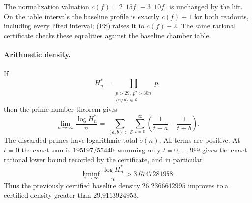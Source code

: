 The normalization valuation
$c(f)=2\lfloor15f\rfloor-3\lfloor10f\rfloor$ is unchanged by the lift.
On the table intervals the baseline profile is exactly $c(f)+1$ for both
readouts, including every lifted interval; (PS) raises it to $c(f)+2$.
The same rational certificate checks these equalities against the
baseline chamber table.

\paragraph{Arithmetic density.}
If
\[
 H_n^*=\prod_{\substack{p>29,\ p^2>30n\\\{n/p\}\in\mathcal S}}p,
\]
then the prime number theorem gives
\[
 \lim_{n\to\infty}\frac{\log H_n^*}{n}
 =\sum_{(a,b)\subset\mathcal S}\sum_{t=0}^{\infty}
      \left(\frac1{t+a}-\frac1{t+b}\right).
\]
The discarded primes have logarithmic total $o(n)$.  All terms are
positive.  At $t=0$ the exact sum is $195197/55440$; summing only
$t=0,\ldots,999$ gives the exact rational lower bound recorded by the
certificate, and in particular
\[
 \liminf_{n\to\infty}\frac{\log H_n^*}{n}
       >3.6747281958.
\]
Thus the previously certified baseline density $26.2366642995$ improves
to a certified density greater than $29.9113924953$.
